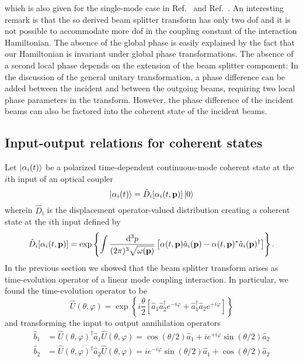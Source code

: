 which is also given for the single-mode case in Ref.~\cite[p.~96]{Leonhardt2003} and Ref.~\cite[p.~130]{Haroche2006}.
An interesting remark is that the so derived beam splitter transform has only two \gls{dof} and it is not possible to accommodate more \gls{dof} in the coupling constant of the interaction Hamiltonian.
The absence of the global phase is easily explained by the fact that our Hamiltonian is invariant under global phase transformations.
The absence of a second local phase depends on the extension of the beam splitter component:
In the discussion of the general unitary transformation, a phase difference can be added between the incident and between the outgoing beams, requiring two local phase parameters in the transform.
However, the phase difference of the incident beams can also be factored into the coherent state of the incident beams.

\FloatBarrier
\subsection{Input-output relations for coherent states}

Let $\ket{\alpha_i(t)}$ be a polarized time-dependent continuous-mode coherent state at the $i$th input of an optical coupler
\begin{equation}
	\ket{\alpha_i(t)}
	=
	\hat{D}_i[\alpha_i(t,\vb{p})]
	\ket{0}
\end{equation}
wherein $\hat{D}_i$ is the displacement operator-valued distribution creating a coherent state at the $i$th input defined by
\begin{equation}
	\hat{D}_i[\alpha_i(t,\vb{p})]
	=
	\exp\left\{
		\int\frac{\dd[3]{p}}{(2\pi)^3\sqrt{\omega(\vb{p})}}
		\left[
			\alpha(t,\vb{p})
			\hat{a}_i(\vb{p})
			-
			\alpha(t,\vb{p})^*
			\hat{a}_i(\vb{p})^\dagger
		\right]
	\right\}
	.
\end{equation}
In the previous section we showed that the beam splitter transform arises as time-evolution operator of a linear mode coupling interaction.
In particular, we found the time-evolution operator to be~\cite[p.~131]{Haroche2006}
\begin{equation}
	\hat{U}(\theta,\varphi)
	=
	\exp\left\{
		i\frac{\theta}{2}
		\left[
			\hat{a}_1
			\hat{a}_2^\dagger
			e^{-i\varphi}
			+
			\hat{a}_1^\dagger
			\hat{a}_2
			e^{+i\varphi}
		\right]
	\right\}
\end{equation}
and transforming the input to output annihilation operators
\begin{align}
	\hat{b}_1
	&=
	\hat{U}(\theta,\varphi)^\dagger
	\hat{a}_1
	\hat{U}(\theta,\varphi)
	=
	\cos(\theta/2)\hat{a}_1
	+
	ie^{+i\varphi}\sin(\theta/2)\hat{a}_2
	\\
	\hat{b}_2
	&=
	\hat{U}(\theta,\varphi)^\dagger
	\hat{a}_2
	\hat{U}(\theta,\varphi)
	=
	ie^{-i\varphi}\sin(\theta/2)\hat{a}_1
	+
	\cos(\theta/2)\hat{a}_2
\end{align}
